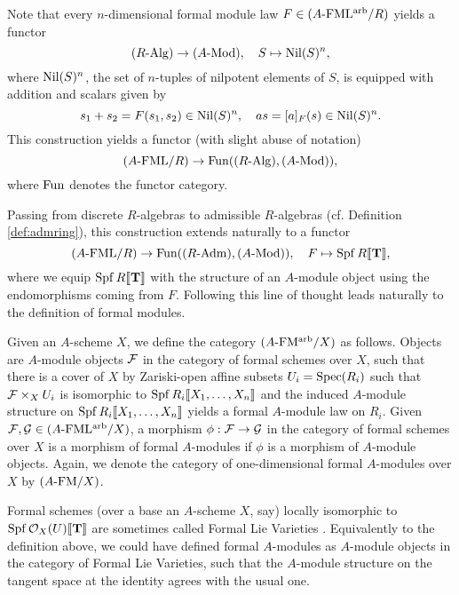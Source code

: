 Note that every $n$-dimensional formal module law $F \in {({A}\text-\mathrm{FML^{arb}}/{R})}$
yields a functor
\begin{equation}\label{eq:fmnilpfunc}
  {({R}\text-\mathrm{Alg})} \to {({A}\text-\mathrm{Mod})}, \quad S \mapsto {\operatorname{Nil}}(S)^n,
\end{equation}
where ${\operatorname{Nil}}(S)^n$, the set of $n$-tuples of nilpotent elements of $S$, is equipped with
addition and scalars given by 
\begin{equation*}
  s_1 + s_2 = F(s_1, s_2) \in {\operatorname{Nil}}(S)^n, \quad a s = [a]_F(s) \in {\operatorname{Nil}}(S)^n.
\end{equation*}
This construction yields a functor (with slight abuse of notation)
\begin{equation}\label{eq:formfunc}
  {({A}\text-\mathrm{FML}/{R})} \to \operatorname{Fun}({({R}\text-\mathrm{Alg})}, {({A}\text-\mathrm{Mod})}),
\end{equation}
where $\operatorname{Fun}$ denotes the functor category.

Passing from discrete $R$-algebras to admissible $R$-algebras (cf. Definition
\ref{def:admring}), this construction extends naturally to a functor 
\begin{equation*}
  {({A}\text-\mathrm{FML}/{R})} \to \operatorname{Fun} ({({R}\text-\mathrm{Adm})}, {({A}\text-\mathrm{Mod})}), \quad F \mapsto \operatorname{Spf} R\llbracket \mathbf{T} \rrbracket,
\end{equation*}
where we equip $\operatorname{Spf} R \llbracket \mathbf{T} \rrbracket$ with the structure of an $A$-module object
using the endomorphisms coming from $F$. 
Following this line of thought leads naturally to the definition of
formal modules. 

\begin{defi}
  Given an $A$-scheme $X$, we define the category
  ${({A}\text-\mathrm{FM^{arb}}/{X})}$ as follows. 
  Objects are $A$-module objects $\mathcal{F}$ in the category
  of formal schemes over $X$, such that 
  there is a cover of $X$ by Zariski-open affine subsets $U_i = \operatorname{Spec} (R_i)$
  such that $\mathcal{F} \times_X U_i$ is isomorphic to $\operatorname{Spf} R_i\llbracket X_1, \dots,
  X_n\rrbracket$ and the induced $A$-module structure on $\operatorname{Spf} R_i\llbracket X_1, \dots, X_n\rrbracket$
  yields a formal $A$-module law on $R_i$. Given $\mathcal{F}, \mathcal{G} \in {({A}\text-\mathrm{FML^{arb}}/{X})}$,
  a morphism $\phi: \mathcal{F} \to \mathcal{G}$ in the category of formal schemes over $X$ is
  a morphism of formal $A$-modules if $\phi$ is a morphism of $A$-module objects.
  Again, we denote the category of one-dimensional formal $A$-modules over $X$
  by ${({A}\text-\mathrm{FM}/{X})}$. 
\end{defi}

\begin{rmk} 
  Formal schemes (over a base an $A$-scheme $X$, say) locally isomorphic to 
  $\operatorname{Spf} \mathcal{O}_X(U)\llbracket \mathbf{T} \rrbracket$ are sometimes called Formal
  Lie Varieties . Equivalently to the definition above, we could
  have defined formal $A$-modules as $A$-module objects in the category of
  Formal Lie Varieties, such that the $A$-module structure
  on the tangent space at the identity agrees with the usual one.
\end{rmk}

